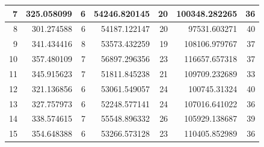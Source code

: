 \begin{table}
\begin{adjustwidth}{}{}
{{\begin{tabular}{|r|r|r|r|r|r|r|}
\hline
7                                          & 325.058099                   & 6                                     & 54246.820145                   & 20                                    & 100348.282265                & 36                                     \\ 
\hline
8                                          & 301.274588                   & 6                                     & 54187.122147                   & 20                                    & 97531.603271                 & 40                                     \\ 
\hline
9                                          & 341.434416                   & 8                                     & 53573.432259                   & 19                                    & 108106.979767                & 37                                     \\ 
\hline
10                                         & 357.480109                   & 7                                     & 56897.296356                   & 23                                    & 116657.657318                & 37                                     \\ 
\hline
11                                         & 345.915623                   & 7                                     & 51811.845238                   & 21                                    & 109709.232689                & 33                                     \\ 
\hline
12                                         & 321.136856                   & 6                                     & 53061.549057                   & 24                                    & 100745.31324                 & 40                                     \\ 
\hline
13                                         & 327.757973                   & 6                                     & 52248.577141                   & 24                                    & 107016.641022                & 36                                     \\ 
\hline
14                                         & 338.574615                   & 7                                     & 55548.896332                   & 26                                    & 105929.138687                & 39                                     \\ 
\hline
15                                         & 354.648388                   & 6                                     & 53266.573128                   & 23                                    & 110405.852989                & 36                                     \\ 

\end{tabular}}}
\end{adjustwidth}
\end{table}
